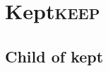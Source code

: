 \section{Kept\hfill{}\textsc{keep}}
\label{sec:org1c59b52}
\subsection{Child of kept}
\label{sec:org7bfd295}
